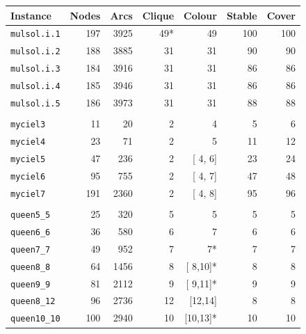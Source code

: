 \documentclass[a4paper,11pt,twoside]{book}
\begin{document}
\begin{multicols}{2}
\vfill
\begin{center}
\small
\begin{tabular}{|lrrrrrr|}
\hline
{\bf Instance} & {\bf Nodes} & {\bf Arcs} & {\bf Clique} & {\bf Colour} & {\bf Stable} & {\bf Cover} \\
\hline
\hline
\verb/mulsol.i.1/ & 197  &   3925   &       49*   &       49   &        100   &        100 \\
\verb/mulsol.i.2/ & 188  &   3885   &       31    &       31   &         90   &         90 \\
\verb/mulsol.i.3/ & 184  &   3916   &       31    &       31   &         86   &         86 \\
\verb/mulsol.i.4/ & 185  &   3946   &       31    &       31   &         86   &         86 \\
\verb/mulsol.i.5/ & 186  &   3973   &       31    &       31   &         88   &         88 \\
&&&&&&\\
\verb/myciel3/   &   11  &     20   &        2    &        4   &          5   &          6 \\
\verb/myciel4/   &   23  &     71   &        2    &        5   &         11   &         12 \\
\verb/myciel5/   &   47  &    236   &        2    &   [ 4, 6]  &         23   &         24 \\
\verb/myciel6/   &   95  &    755   &        2    &   [ 4, 7]  &         47   &         48 \\
\verb/myciel7/   &  191  &   2360   &        2    &   [ 4, 8]  &         95   &         96 \\
&&&&&&\\
\verb/queen5_5/  &   25  &    320    &       5   &         5   &          5   &          5 \\
\verb/queen6_6/  &   36  &    580    &       6   &         7   &          6   &          6 \\
\verb/queen7_7/  &   49  &    952    &       7   &         7*  &          7   &          7 \\
\verb/queen8_8/  &   64  &   1456    &       8   &    [ 8,10]* &          8   &          8 \\ 
\verb/queen9_9/  &   81  &   2112    &       9   &    [ 9,11]* &          9   &          9 \\
\verb/queen8_12/ &   96  &   2736    &      12   &    [12,14]  &          8   &          8 \\ 
\verb/queen10_10/&  100  &   2940    &      10   &    [10,13]* &         10   &         10 \\

\end{tabular}
\end{center}
\end{multicols}
\end{document}

